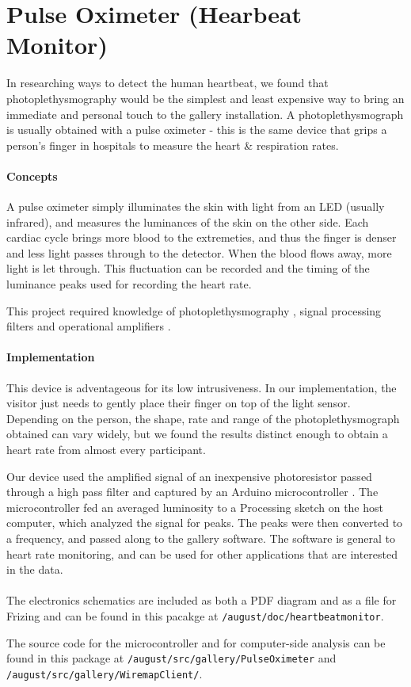 \section{Pulse Oximeter (Hearbeat Monitor)}
In researching ways to detect the human heartbeat, we found that photoplethysmography would be the simplest and least expensive way to bring an immediate and personal touch to the gallery installation. A photoplethysmograph is usually obtained with a pulse oximeter - this is the same device that grips a person's finger in hospitals to measure the heart \& respiration rates. 

\paragraph{Concepts}
A pulse oximeter simply illuminates the skin with light from an LED (usually infrared), and measures the luminances of the skin on the other side. Each cardiac cycle brings more blood to the extremeties, and thus the finger is denser and less light passes through to the detector. When the blood flows away, more light is let through. This fluctuation can be recorded and the timing of the luminance peaks used for recording the heart rate.

This project required knowledge of photoplethysmography \cite{PO} \cite{EC1}, signal processing filters \cite{EC2} and operational amplifiers \cite{HL} \cite{BK} \cite{BB}.

\paragraph{Implementation}
This device is adventageous for its low intrusiveness. In our implementation, the visitor just needs to gently place their finger on top of the light sensor. Depending on the person, the shape, rate and range of the photoplethysmograph obtained can vary widely, but we found the results distinct enough to obtain a heart rate from almost every participant. 

Our device used the amplified signal of an inexpensive photoresistor passed through a high pass filter and captured by an Arduino microcontroller \cite{ARD}. The microcontroller fed an averaged luminosity to a Processing \cite{P5} sketch on the host computer, which analyzed the signal for peaks. The peaks were then converted to a frequency, and passed along to the gallery software. The software is general to heart rate monitoring, and can be used for other applications that are interested in the data.

\paragraph{}
The electronics schematics are included as both a PDF diagram and as a file for Frizing\cite{FTZ} and can be found in this pacakge at \texttt{/august/doc/heartbeatmonitor}.

The source code for the microcontroller and for computer-side analysis can be found in this package at \texttt{/august/src/gallery/PulseOximeter} and \texttt{/august/src/gallery/WiremapClient/}.
